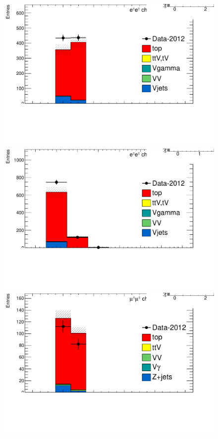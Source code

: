 \begin{figure}[htbp]

  \begin{minipage}[h]{0.5\textwidth}
    \centering \includegraphics[width=\textwidth]{figs/fake/TaT-23jets-1b_nj_ee}
  \end{minipage}\hfill
  \begin{minipage}[h]{0.5\textwidth}
    \centering \includegraphics[width=\textwidth]{figs/fake/TaT-23jets-1b_nb_ee}
  \end{minipage}\hfill
  \begin{minipage}[h]{0.5\textwidth}
    \centering \includegraphics[width=\textwidth]{figs/fake/TaT-23jets-1b_nj_mm}

\end{minipage}
\end{figure}

